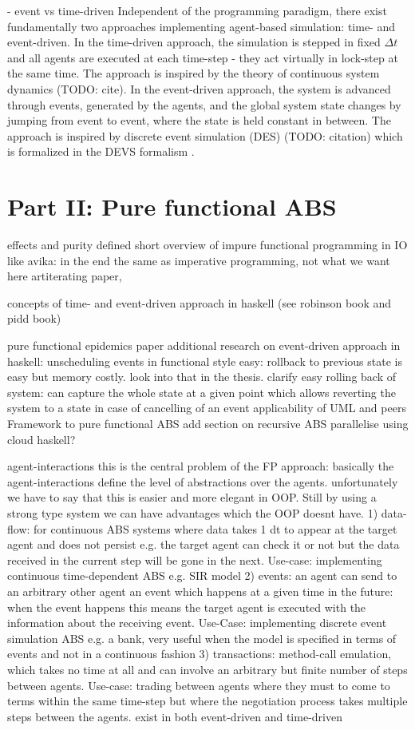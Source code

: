 - event vs time-driven
Independent of the programming paradigm, there exist fundamentally two approaches implementing agent-based simulation: time- and event-driven. In the time-driven approach, the simulation is stepped in fixed $\Delta t$ and all agents are executed at each time-step - they act virtually in lock-step at the same time. The approach is inspired by the theory of continuous system dynamics (TODO: cite).
In the event-driven approach, the system is advanced through events, generated by the agents, and the global system state changes by jumping from event to event, where the state is held constant in between. The approach is inspired by discrete event simulation (DES) (TODO: citation) which is formalized in the DEVS formalism \cite{zeigler_theory_2000}.


\section{Part II: Pure functional ABS}
effects and purity defined
short overview of impure functional programming in IO like avika: in the end the same as imperative programming, not what we want here
artiterating paper,

concepts of time- and event-driven approach in haskell (see robinson book and pidd book)

pure functional epidemics paper
additional research on event-driven approach in haskell: unscheduling events in functional style easy: rollback to previous state is easy but memory costly. look into that in the thesis. clarify easy rolling back of system: can capture the whole state at a given point which allows reverting the system to a state in case of cancelling of an event
applicability of UML and peers Framework to pure functional ABS 
add section on recursive ABS
parallelise using cloud haskell?

agent-interactions
this is the central problem of the FP approach: basically the agent-interactions define the level of abstractions over the agents. unfortunately we have to say that this is easier and more elegant in OOP. Still by using a strong type system we can have advantages which the OOP doesnt have.
1) data-flow: for continuous ABS systems where data takes 1 dt to appear at the target agent and does not persist e.g. the target agent can check it or not but the data received in the current step will be gone in the next. Use-case: implementing continuous time-dependent ABS e.g. SIR model
2) events: an agent can send to an arbitrary other agent an event which happens at a given time in the future: when the event happens this means the target agent is executed with the information about the receiving event. Use-Case: implementing discrete event simulation ABS e.g. a bank, very useful when the model is specified in terms of events and not in a continuous fashion
3) transactions: method-call emulation, which takes no time at all and can involve an arbitrary but finite number of steps between agents. Use-case: trading between agents where they must to come to terms within the same time-step but where the negotiation process takes multiple steps between the agents. exist in both event-driven and time-driven

